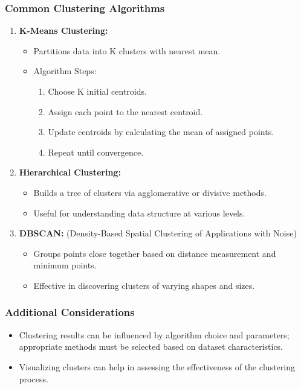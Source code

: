 \documentclass[aspectratio=169]{beamer}
\begin{document}
\begin{frame}[fragile]
    \frametitle{Common Clustering Algorithms}
    \begin{enumerate}
        \item \textbf{K-Means Clustering:}
            \begin{itemize}
                \item Partitions data into K clusters with nearest mean.
                \item Algorithm Steps:
                    \begin{enumerate}
                        \item Choose K initial centroids.
                        \item Assign each point to the nearest centroid.
                        \item Update centroids by calculating the mean of assigned points.
                        \item Repeat until convergence.
                    \end{enumerate}
            \end{itemize}
        \item \textbf{Hierarchical Clustering:}
            \begin{itemize}
                \item Builds a tree of clusters via agglomerative or divisive methods.
                \item Useful for understanding data structure at various levels.
            \end{itemize}
        \item \textbf{DBSCAN:} (Density-Based Spatial Clustering of Applications with Noise)
            \begin{itemize}
                \item Groups points close together based on distance measurement and minimum points.
                \item Effective in discovering clusters of varying shapes and sizes.
            \end{itemize}
    \end{enumerate}
\end{frame}

\begin{frame}[fragile]
    \frametitle{Additional Considerations}
    \begin{itemize}
        \item Clustering results can be influenced by algorithm choice and parameters; appropriate methods must be selected based on dataset characteristics.
        \item Visualizing clusters can help in assessing the effectiveness of the clustering process.
    \end{itemize}
\end{frame}
\end{document}
